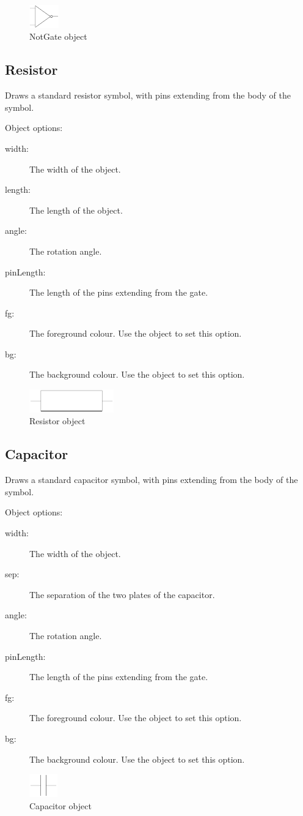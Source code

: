 \begin{figure}[h]
\centerline{\includegraphics[height=1cm]{electronics/NotGate}}
\caption{NotGate object}
\label{fig:not_gate}
\end{figure}

\subsection{Resistor}
Draws a standard resistor symbol, with pins extending from the body of the
symbol.

Object options:
\begin{description}
\item[width:] The width of the object.
\item[length:] The length of the object.
\item[angle:] The rotation angle.
\item[pinLength:] The length of the pins extending from the gate.
\item[fg:] The foreground colour.  Use the  object to set this
option.
\item[bg:] The background colour.  Use the  object to set this
option.
\end{description}

\begin{figure}[h]
\centerline{\includegraphics[height=1cm]{electronics/Resistor}}
\caption{Resistor object}
\label{fig:resistor}
\end{figure}

\subsection{Capacitor}
Draws a standard capacitor symbol, with pins extending from the body of the
symbol.

Object options:
\begin{description}
\item[width:] The width of the object.
\item[sep:] The separation of the two plates of the capacitor.
\item[angle:] The rotation angle.
\item[pinLength:] The length of the pins extending from the gate.
\item[fg:] The foreground colour.  Use the  object to set this
option.
\item[bg:] The background colour.  Use the  object to set this
option.
\end{description}

\begin{figure}[h]
\centerline{\includegraphics[height=1cm]{electronics/Capacitor}}
\caption{Capacitor object}
\label{fig:capacitor}
\end{figure}

